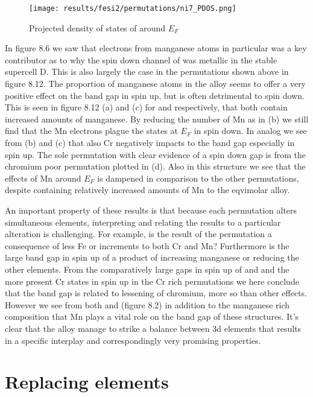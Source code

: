 \begin{figure}[H]
	\centering
	\texttt{[image: results/fesi2/permutations/ni7\_PDOS.png]}
	\caption{Projected density of states of  around $E_F$}
\end{figure}

In figure 8.6 we saw that electrons from manganese atoms in particular was a key contributor as to why the spin down channel of  was metallic in the stable supercell D. This is also largely the case in the permutations shown above in figure 8.12. The proportion of manganese atoms in the alloy seems to offer a very positive effect on the band gap in spin up, but is often detrimental to spin down. This is seen in figure 8.12 (a) and (c) for  and  respectively, that both contain increased amounts of manganese. By reducing the number of Mn as in (b) we still find that the Mn electrons plague the states at $E_F$ in spin down. In analog we see from (b) and (c) that also Cr negatively impacts to the band gap especially in spin up. The sole permutation with clear evidence of a spin down gap is from the chromium poor permutation plotted in (d). Also in this structure we see that the effects of Mn around $E_F$ is dampened in comparison to the other permutations, despite containing relatively increased amounts of Mn to the eqvimolar alloy.  

An important property of these results is that because each permutation alters simultaneous elements, interpreting and relating the results to a particular alteration is challenging. For example, is the result of the  permutation a consequence of less Fe or increments to both Cr and Mn? Furthermore is the large band gap in spin up of  a product of increasing manganese or reducing the other elements. From the comparatively large gaps in spin up of  and  and the more present Cr states in spin up in the Cr rich permutations we here conclude that the band gap is related to lessening of chromium, more so than other effects. However we see from both  and  (figure 8.2) in addition to the manganese rich composition that Mn plays a vital role on the band gap of these structures. It's clear that the  alloy manage to strike a balance between 3d elements that results in a specific interplay and correspondingly very promising properties. 

\section{Replacing elements}

